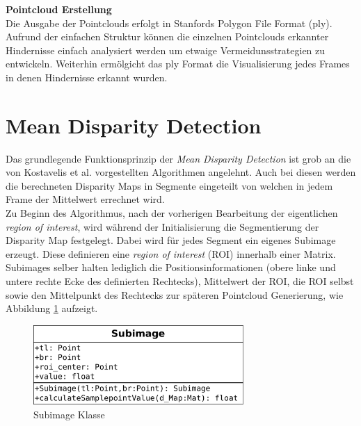 \noindent
\textbf{Pointcloud Erstellung}\\
Die Ausgabe der Pointclouds erfolgt in Stanfords Polygon File Format (ply). Aufrund der einfachen Struktur können die einzelnen Pointclouds erkannter Hindernisse einfach analysiert werden um etwaige Vermeidunsstrategien zu entwickeln. Weiterhin ermölgicht das ply Format die Visualisierung jedes Frames in denen Hindernisse erkannt wurden.

	

\section{Mean Disparity Detection}
\label{sec:mean_disparity_detection}

Das grundlegende Funktionsprinzip der \emph{Mean Disparity Detection} ist grob an die von Kostavelis et al. vorgestellten Algorithmen angelehnt. Auch bei diesen werden die berechneten Disparity Maps in Segmente eingeteilt von welchen in jedem Frame der Mittelwert errechnet wird.\\

\noindent
Zu Beginn des Algorithmus, nach der vorherigen Bearbeitung der eigentlichen \emph{region of interest}, wird während der Initialisierung die Segmentierung der Disparity Map festgelegt. Dabei wird für jedes Segment ein eigenes Subimage erzeugt. Diese definieren eine \emph{region of interest} (ROI) innerhalb einer Matrix. Subimages selber halten lediglich die Positionsinformationen (obere linke und untere rechte Ecke des definierten Rechtecks), Mittelwert der ROI, die ROI selbst sowie den Mittelpunkt des Rechtecks zur späteren Pointcloud Generierung, wie Abbildung \ref{fig:subimage_class} aufzeigt.

\begin{figure}[h]
	\begin{center}
		\includegraphics[width=8cm]{img/subimage_class.pdf}
	\end{center}
	\caption{Subimage Klasse}
	\label{fig:subimage_class}
\end{figure}

